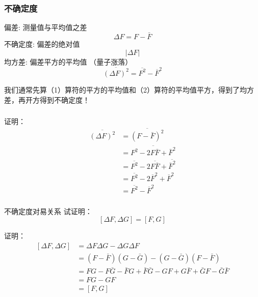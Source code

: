 \begin{frame} 
    \frametitle{不确定度}
    \begin{itemize}
        \Item 偏差: 测量值与平均值之差
        $$ \Delta F=F-\bar{F} $$
        \Item 不确定度: 偏差的绝对值
         $$ \left | \Delta F  \right | $$
        \Item 均方差: 偏差平方的平均值 （量子涨落）
        $$ \overline{(\Delta F)^2} = \overline{F^2} - \overline{F}^2$$
    \end{itemize}   
    我们通常先算（1）算符的平方的平均值和（2）算符的平均值平方，得到了均方差，再开方得到不确定度！
\end{frame} 

\begin{frame} 
    \frametitle{}
    \alert{证明：}
    \begin{equation*}
        \begin{split} 
        \overline{(\Delta F)^2}&= \overline{(F-\bar{F})^2}\\
        &=\overline{F^2-2F\bar{F}+\bar{F}^2 }\\
        &=\overline{F^2} -2\overline{F\bar{F}} +\overline{\bar{F}^2 }\\
        &=\overline{F^2} -2\overline{F}^2 +\overline{F}^2\\
        &= \overline{F^2} - \overline{F}^2
        \end{split}  
    \end{equation*} 
\end{frame} 

\begin{frame} 
    \frametitle{}
    \begin{tcolorbox2}{不确定度对易关系}
     试证明：  $$[\Delta F, \Delta G]= [F, G]$$
    \end{tcolorbox2}
    \alert{证明：}
    \begin{equation*}
        \begin{split} 
        [\Delta F, \Delta G]&= \Delta F \Delta G - \Delta G \Delta F \\
        &=(F-\bar{F}) (G-\bar{G})- (G-\bar{G}) (F-\bar{F}) \\
        &=FG -F\bar{G}-\bar{F}G + \bar{F} \bar{G} -GF + G \bar{F} + \bar{G} F -\bar{G} \bar{F}   \\
        &=FG-GF \\
        &=[F, G]
        \end{split}  
    \end{equation*} 
\end{frame} 

